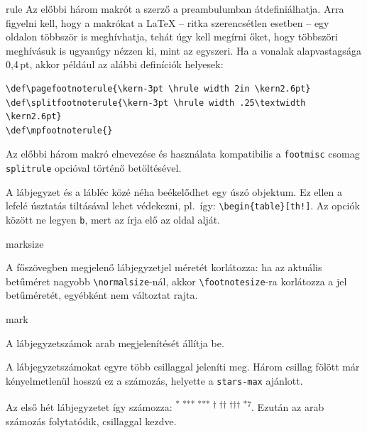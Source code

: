 \documentclass[12pt]{article}
\begin{document}
\begin{description}
\begin{footstyle}{rule}
Az előbbi három makrót a szerző a preambulumban átdefiniálhatja.
Arra figyelni kell, hogy a makrókat a \LaTeX{} -- ritka szerencsétlen esetben -- egy oldalon többször is meghívhatja, tehát úgy kell megírni őket, hogy többszöri meghívásuk is ugyanúgy nézzen ki, mint az egyszeri.
Ha a vonalak alapvastagsága 0,4\,pt, akkor például az alábbi definíciók helyesek:\par
\begin{footnotesize}
\begin{verbatim}
\def\pagefootnoterule{\kern-3pt \hrule width 2in \kern2.6pt}
\def\splitfootnoterule{\kern-3pt \hrule width .25\textwidth \kern2.6pt}
\def\mpfootnoterule{}
\end{verbatim}
\end{footnotesize}
Az előbbi három makró elnevezése és használata kompatibilis a \texttt{footmisc} csomag \texttt{splitrule} opcióval történő betöltésével. 

A lábjegyzet és a lábléc közé néha beékelődhet egy úszó objektum.
Ez ellen a lefelé úsztatás tiltásával lehet védekezni, pl.~így: \verb|\begin{table}[th!]|.
Az opciók között ne legyen \texttt{b}, mert az írja elő az oldal alját.

\end{footstyle}

\begin{footstyle}{marksize}

\item[max-normal]
A főszövegben megjelenő lábjegyzetjel méretét korlátozza:
ha az aktuális betűméret nagyobb \verb|\normalsize|-nál, akkor \verb|\footnotesize|-ra korlátozza a jel betűméretét, egyébként nem változtat rajta.

\end{footstyle}

\begin{footstyle}{mark}

\item[arabic]
A lábjegyzetszámok arab megjelenítését állítja be.

\item[stars]
A lábjegyzetszámokat egyre több csillaggal jeleníti meg.
Három csillag fölött már kényelmetlenül hosszú ez a számozás, helyette a \texttt{stars-max} ajánlott.

\item[stars-max]
Az első hét lábjegyzetet így számozza: \textsuperscript{* *** *** † †† ††† *7}. 
Ezután az arab számozás folytatódik, csillaggal kezdve.


\end{footstyle}
\end{description}
\end{document}
